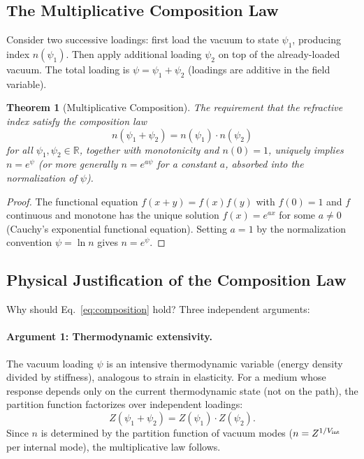 \documentclass[11pt]{article}
\theoremstyle{plain}
\newtheorem{theorem}{Theorem}
\theoremstyle{definition}
\theoremstyle{remark}
\begin{document}
\subsection{The Multiplicative Composition Law}

Consider two successive loadings: first load the vacuum to state
$\psi_1$, producing index $n(\psi_1)$. Then apply additional loading
$\psi_2$ on top of the already-loaded vacuum. The total loading is
$\psi = \psi_1 + \psi_2$ (loadings are additive in the field variable).

\begin{theorem}[Multiplicative Composition]
\label{thm:multiplicative}
The requirement that the refractive index satisfy the composition law
\begin{equation}
n(\psi_1 + \psi_2) = n(\psi_1) \cdot n(\psi_2)
\label{eq:composition}
\end{equation}
for all $\psi_1, \psi_2 \in \mathbb{R}$, together with monotonicity and
$n(0) = 1$, uniquely implies $n = e^{\psi}$ (or more generally
$n = e^{a\psi}$ for a constant $a$, absorbed into the normalization of
$\psi$).
\end{theorem}

\begin{proof}
The functional equation $f(x + y) = f(x)f(y)$ with $f(0) = 1$ and
$f$ continuous and monotone has the unique solution $f(x) = e^{ax}$
for some $a \neq 0$ (Cauchy's exponential functional equation). Setting
$a = 1$ by the normalization convention $\psi = \ln n$ gives $n = e^\psi$.
\end{proof}

\subsection{Physical Justification of the Composition Law}

Why should Eq.~\eqref{eq:composition} hold? Three independent arguments:

\paragraph{Argument 1: Thermodynamic extensivity.}
The vacuum loading $\psi$ is an intensive thermodynamic variable (energy
density divided by stiffness), analogous to strain in elasticity. For a
medium whose response depends only on the current thermodynamic state
(not on the path), the partition function factorizes over independent
loadings:
\begin{equation}
Z(\psi_1 + \psi_2) = Z(\psi_1) \cdot Z(\psi_2).
\end{equation}
Since $n$ is determined by the partition function of vacuum modes
($n = Z^{1/V_{\rm int}}$ per internal mode), the multiplicative law follows.
\end{document}
